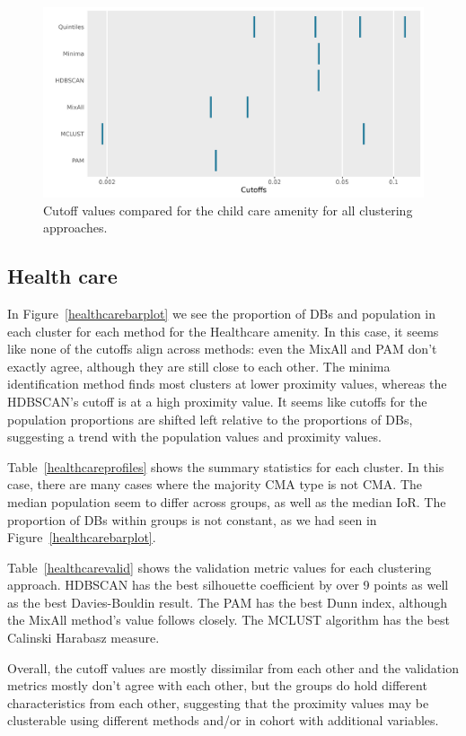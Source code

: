 \documentclass[11pt, a4paper]{article}
\begin{document}
\begin{figure}[H]
\centering
\includegraphics[width=\textwidth]{./cutoff_ticks/Child care_ticks.png}
\caption[Child care cutoff comparison]{Cutoff values compared for the child care amenity for all clustering approaches.}\label{childcareticks}
\end{figure}






\pagebreak
\justifying
\subsection{Health care}



In Figure~\ref{healthcarebarplot} we see the proportion of DBs and population in each cluster for each method for the Healthcare amenity. In this case, it seems like none of the cutoffs align across methods: even the MixAll and PAM don't exactly agree, although they are still close to each other. The minima identification method finds most clusters at lower proximity values, whereas the HDBSCAN's cutoff is at a high proximity value. It seems like cutoffs for the population proportions are shifted left relative to the proportions of DBs, suggesting a trend with the population values and proximity values.
\par
Table~\ref{healthcareprofiles} shows the summary statistics for each cluster. In this case, there are many cases where the majority CMA type is not CMA. The median population seem to differ across groups, as well as the median IoR. The proportion of DBs within groups is not constant, as we had seen in Figure~\ref{healthcarebarplot}.
\par
Table~\ref{healthcarevalid} shows the validation metric values for each clustering approach. HDBSCAN has the best silhouette coefficient by over 9 points as well as the best Davies-Bouldin result. The PAM has the best Dunn index, although the MixAll method's value follows closely. The MCLUST algorithm has the best Calinski Harabasz measure.
\par
Overall, the cutoff values are mostly dissimilar from each other and the validation metrics mostly don't agree with each other, but the groups do hold different characteristics from each other, suggesting that the proximity values may be clusterable using different methods and/or in cohort with additional variables.
\end{document}
